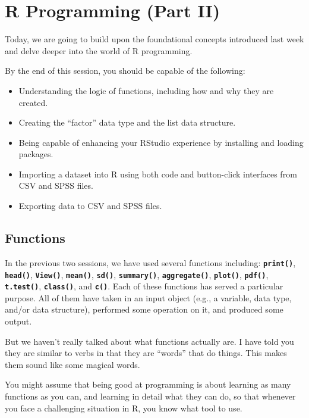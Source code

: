 \documentclass[
]{book}
\begin{document}
\hypertarget{programming2}{%
\chapter{\texorpdfstring{\textbf{R Programming (Part II)}}{R Programming (Part II)}}\label{programming2}}

Today, we are going to build upon the foundational concepts introduced last week and delve deeper into the world of R programming.

By the end of this session, you should be capable of the following:

\begin{itemize}
\item
  Understanding the logic of functions, including how and why they are created.
\item
  Creating the ``factor'' data type and the list data structure.
\item
  Being capable of enhancing your RStudio experience by installing and loading packages.
\item
  Importing a dataset into R using both code and button-click interfaces from CSV and SPSS files.
\item
  Exporting data to CSV and SPSS files.
\end{itemize}

\hypertarget{functions}{%
\section{Functions}\label{functions}}

In the previous two sessions, we have used several functions including: \textbf{\texttt{print()}}, \textbf{\texttt{head()}}, \textbf{\texttt{View()}}, \textbf{\texttt{mean()}}, \textbf{\texttt{sd()}}, \textbf{\texttt{summary()}}, \textbf{\texttt{aggregate()}}, \textbf{\texttt{plot()}}, \textbf{\texttt{pdf()}}, \textbf{\texttt{t.test()}}, \textbf{\texttt{class()}}, and \textbf{\texttt{c()}}. Each of these functions has served a particular purpose. All of them have taken in an input object (e.g., a variable, data type, and/or data structure), performed some operation on it, and produced some output.

But we haven't really talked about what functions actually are. I have told you they are similar to verbs in that they are ``words'' that do things. This makes them sound like some magical words.

You might assume that being good at programming is about learning as many functions as you can, and learning in detail what they can do, so that whenever you face a challenging situation in R, you know what tool to use.
\end{document}

